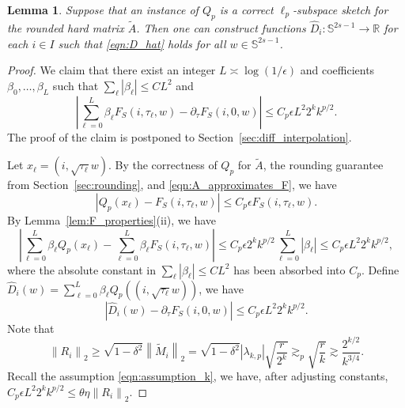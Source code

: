 \documentclass[11pt]{article}
\newtheorem{lemma}[theorem]{Lemma}
\theoremstyle{remark}
\theoremstyle{definition}
\newcommand{\Sph}{\mathbb{S}}
\newcommand{\R}{\mathbb{R}}
\newcommand{\eps}{\epsilon}
\newcommand{\norm}[1]{\left\|#1\right\|}
\begin{document}
\begin{lemma}\label{lem:derivative_approximation}
	Suppose that an instance of $Q_p$ is a correct $\ell_p$-subspace sketch for the rounded hard matrix $\widetilde{A}$.
	Then one can construct functions $\hat{D}_i:\Sph^{2s-1}\to\R$ for each $i\in I$ such that \eqref{eqn:D_hat} holds for all $w\in \Sph^{2s-1}$.
\end{lemma}
\begin{proof}
	We claim that there exist an integer $L\asymp \log(1/\eps)$ and coefficients $\beta_0,\dots,\beta_L$ such that $\sum_\ell |\beta_\ell| \leq C L^2$ and
	\[
		\left| \sum_{\ell=0}^L \beta_\ell F_S(i,\tau_\ell,w) - \partial_\tau F_S(i,0,w) \right| \leq C_p \eps L^2 2^k k^{p/2}.
	\]
	The proof of the claim is postponed to Section~\ref{sec:diff_interpolation}.
	
	Let $x_\ell = (i, \sqrt{\tau_\ell}w)$. By the correctness of $Q_p$ for $\widetilde{A}$, the rounding guarantee from Section~\ref{sec:rounding}, and \eqref{eqn:A_approximates_F}, we have
	\[
		\left| Q_p(x_\ell) - F_S(i,\tau_\ell,w) \right| \leq C_p\eps F_S(i,\tau_\ell,w).
	\]
	By Lemma~\ref{lem:F_properties}(ii), we have
	\[
		\left| \sum_{\ell=0}^L \beta_\ell  Q_p(x_\ell) - \sum_{\ell=0}^L \beta_\ell F_S(i,\tau_\ell,w) \right| \leq C_p \eps 2^k k^{p/2} \sum_{\ell=0}^L |\beta_\ell| \leq C_p \eps L^2 2^k k^{p/2},
	\]
	where the absolute constant in $\sum_\ell|\beta_\ell|\leq C L^2$ has been absorbed into $C_p$.
	Define $\hat{D}_i(w) = \sum_{\ell=0}^L \beta_\ell Q_p((i, \sqrt{\tau_\ell}w))$, we have
	\[
		\left|\hat{D}_i(w) - \partial_\tau F_S(i,0,w)  \right| \leq C_p \eps L^2 2^k k^{p/2}.
	\]
	Note that 
	\[
		\norm{R_i}_2 \geq \sqrt{1-\delta^2}\norm{\widetilde{M}_i}_2 = \sqrt{1-\delta^2}|\lambda_{k,p}|\sqrt{\frac{r}{2^k}} \gtrsim_p \sqrt{\frac{r}{k}} \gtrsim \frac{2^{k/2}}{k^{3/4}}.
	\]
	Recall the assumption \eqref{eqn:assumption_k}, we have, after adjusting constants, $C_p \eps L^2 2^k k^{p/2} \leq \theta \eta \norm{R_i}_2$.
\end{proof}
\end{document}
